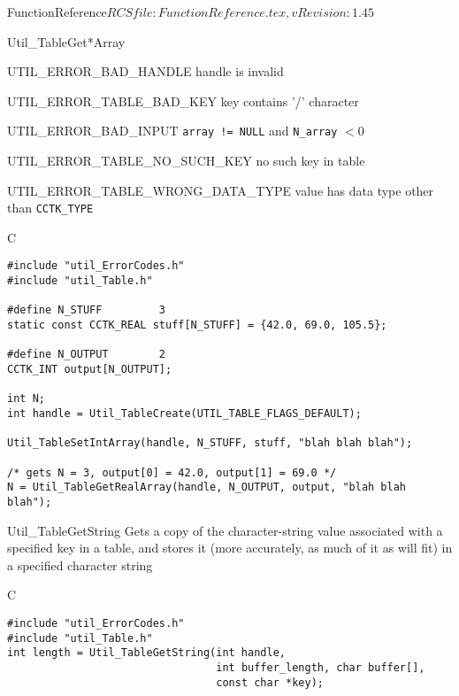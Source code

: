 \begin{cactuspart}{5}{FunctionReference}{$RCSfile: FunctionReference.tex,v $}{$Revision: 1.45 $}
\begin{FunctionDescription}{Util\_TableGet*Array}
\begin{Error}{UTIL\_ERROR\_BAD\_HANDLE}
handle is invalid
\end{Error}
\begin{Error}{UTIL\_ERROR\_TABLE\_BAD\_KEY}
key contains '/' character
\end{Error}
\begin{Error}{UTIL\_ERROR\_BAD\_INPUT}
\verb|array != NULL| and \verb|N_array| $< 0$
\end{Error}
\begin{Error}{UTIL\_ERROR\_TABLE\_NO\_SUCH\_KEY}
no such key in table
\end{Error}
\begin{Error}{UTIL\_ERROR\_TABLE\_WRONG\_DATA\_TYPE}
value has data type other than \verb|CCTK_TYPE|
\end{Error}

\begin{Example}{C}
\begin{verbatim}
#include "util_ErrorCodes.h"
#include "util_Table.h"

#define N_STUFF         3
static const CCTK_REAL stuff[N_STUFF] = {42.0, 69.0, 105.5};

#define N_OUTPUT        2
CCTK_INT output[N_OUTPUT];

int N;
int handle = Util_TableCreate(UTIL_TABLE_FLAGS_DEFAULT);

Util_TableSetIntArray(handle, N_STUFF, stuff, "blah blah blah");

/* gets N = 3, output[0] = 42.0, output[1] = 69.0 */
N = Util_TableGetRealArray(handle, N_OUTPUT, output, "blah blah blah");
\end{verbatim}
\end{Example}
\end{FunctionDescription}


\begin{FunctionDescription}{Util\_TableGetString}
\label{Util-TableGetString}
Gets a copy of the character-string value associated with a specified
key in a table, and stores it (more accurately, as much of it as will fit)
in a specified character string

\begin{Synopsis}{C}
\begin{verbatim}
#include "util_ErrorCodes.h"
#include "util_Table.h"
int length = Util_TableGetString(int handle,
                                 int buffer_length, char buffer[],
                                 const char *key);
\end{verbatim}
\end{Synopsis}


\end{FunctionDescription}
\end{cactuspart}
